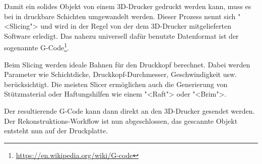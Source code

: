 Damit ein solides Objekt von einem 3D-Drucker gedruckt werden kann, muss es bei
in druckbare Schichten umgewandelt werden. Dieser Prozess nennt sich "<Slicing">
und wird in der Regel von der dem 3D-Drucker mitgelieferten Software erledigt.
%
%
Das nahezu universell dafür benutzte Datenformat ist der sogenannte
G-Code\footnote{\url{https://en.wikipedia.org/wiki/G-code}}.

Beim Slicing werden ideale Bahnen für den Druckkopf berechnet. Dabei werden
Parameter wie Schichtdicke, Druckkopf-Durchmesser, Geschwindigkeit usw.
berücksichtigt. Die meisten Slicer ermöglichen auch die Generierung von
Stützmaterial oder Haftungshilfen wie einem "<Raft"> oder "<Brim">.

Der resultierende G-Code kann dann direkt an den 3D-Drucker gesendet werden. Der
Rekonstruktions-Workflow ist nun abgeschlossen, das gescannte Objekt entsteht
nun auf der Druckplatte.

